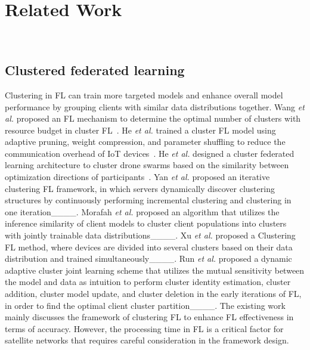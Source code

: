\section{Related Work}
~\label{sec:relatedwork}
\subsection{Clustered federated learning}
Clustering in FL can train more targeted models and enhance overall model performance by grouping clients with similar data distributions together. Wang \textit{et al.} proposed an FL mechanism to determine the optimal number of clusters with resource budget in cluster FL~\cite {WangTMC22}. He \textit{et al.} trained a cluster FL model using adaptive pruning, weight compression, and parameter shuffling to reduce the communication overhead of IoT devices~\cite {HeIOT24}. He \textit{et al.} designed a cluster federated learning architecture to cluster drone swarms based on the similarity between optimization directions of participants~\cite {HeTVT23}. Yan \textit{et al.} proposed an iterative clustering FL framework, in which servers dynamically discover clustering structures by continuously performing incremental clustering and clustering in one iteration____. Morafah \textit{et al.} proposed an algorithm that utilizes the inference similarity of client models to cluster client populations into clusters with jointly trainable data distributions____. Xu \textit{et al.} proposed a Clustering FL method, where devices are divided into several clusters based on their data distribution and trained simultaneously____. 
Run \textit{et al.} proposed a dynamic adaptive cluster joint learning scheme that utilizes the mutual sensitivity between the model and data as intuition to perform cluster identity estimation, cluster addition, cluster model update, and cluster deletion in the early iterations of FL, in order to find the optimal client cluster partition____.
The existing work mainly discusses the framework of clustering FL to enhance FL effectiveness in terms of accuracy. 
However, the processing time in FL is a critical factor for satellite networks that requires careful consideration in the framework design.



